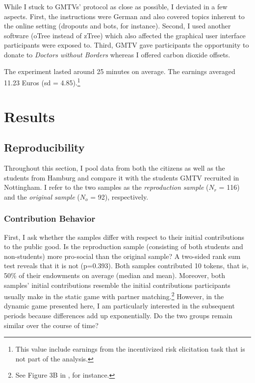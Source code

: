 \documentclass[
  authoryear,
  review,
  3p,
  onecolumn]{elsarticle}
\begin{document}
While I stuck to GMTVs' protocol as close as possible, I deviated in a
few aspects. First, the instructions were German and also covered topics
inherent to the online setting (dropouts and bots, for instance).
Second, I used another software (oTree instead of zTree) which also
affected the graphical user interface participants were exposed to.
Third, GMTV gave participants the opportunity to donate to \emph{Doctors
without Borders} whereas I offered carbon dioxide offsets.

The experiment lasted around 25 minutes on average. The earnings
averaged 11.23 Euros (sd = 4.85).\footnote{This value include earnings
  from the incentivized risk elicitation task that is not part of the
  analysis.}

\hypertarget{sec-results}{%
\section{Results}\label{sec-results}}

\hypertarget{sec-replication}{%
\subsection{Reproducibility}\label{sec-replication}}

Throughout this section, I pool data from both the citizens as well as
the students from Hamburg and compare it with the students GMTV
recruited in Nottingham. I refer to the two samples as the
\emph{reproduction sample} (\(N_r\) = 116) and the \emph{original
sample} (\(N_o\) = 92), respectively.

\hypertarget{sec-contributions}{%
\subsubsection{Contribution Behavior}\label{sec-contributions}}

First, I ask whether the samples differ with respect to their initial
contributions to the public good. Is the reproduction sample (consisting
of both students and non-students) more pro-social than the original
sample? A two-sided rank sum test reveals that it is not (p=0.393). Both
samples contributed 10 tokens, that is, 50\% of their endowments on
average (median and mean). Moreover, both samples' initial contributions
resemble the initial contributions participants usually make in the
static game with partner matching.\footnote{See Figure 3B in
  \citet[p.989]{fehrgaechter2000}, for instance.} However, in the
dynamic game presented here, I am particularly interested in the
subsequent periods because differences add up exponentially. Do the two
groups remain similar over the course of time?
\end{document}

